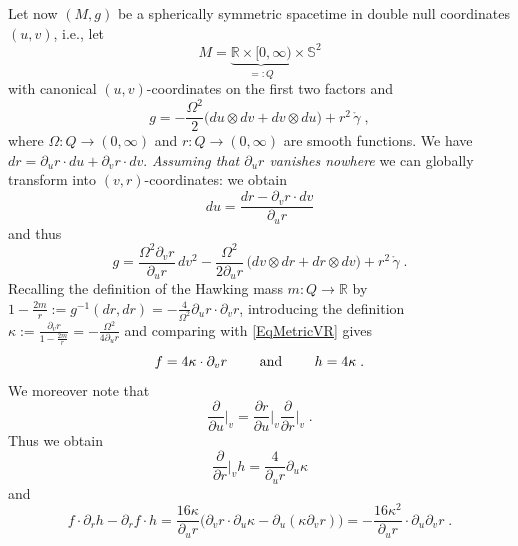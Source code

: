\documentclass[reqno]{article}
\newcommand{\R}{\mathbb{R}}
\newcommand{\rd}{\partial}
\begin{document}
Let now $(M,g)$ be a spherically symmetric spacetime in double null coordinates $(u,v)$, i.e., let $$M = \underbrace{\R \times [0, \infty)}_{=:Q} \times \mathbb{S}^2$$ with canonical $(u,v)$-coordinates on the first two factors and $$g = - \frac{\Omega^2}{2} \big( du \otimes dv + dv \otimes du\big) + r^2 \, \mathring{\gamma} \;,$$ where $\Omega : Q \to (0, \infty)$ and $r : Q \to (0, \infty)$ are smooth functions. We have $dr = \rd_u r \cdot du + \rd_v r \cdot dv$. \emph{Assuming that $\rd_u r $ vanishes nowhere} we can globally transform into $(v,r)$-coordinates: we obtain  $$du = \frac{dr - \rd_v r \cdot dv}{\rd_u r} $$ and thus $$g =  \frac{\Omega^2 \rd_v r}{ \rd_u r} \, dv^2- \frac{\Omega^2}{2 \rd_u r} \, \big( dv \otimes dr + dr \otimes dv\big) + r^2 \, \mathring{\gamma} \;.$$ Recalling the definition of the Hawking mass $m : Q \to \R$ by $1 - \frac{2m}{r} := g^{-1}(dr, dr) = - \frac{4}{\Omega^2} \rd_u r \cdot \rd_v r$, introducing the definition $\kappa := \frac{\rd_v r}{1 - \frac{2m}{r}} = - \frac{\Omega^2}{4 \rd_u r}$ and comparing with \eqref{EqMetricVR} gives
\begin{equation} \label{Eq11}
f = 4 \kappa \cdot \rd_v r \qquad \textnormal{ and } \qquad h = 4 \kappa \;.
\end{equation}
We moreover note that $$\frac{\rd}{\rd u} \Big|_v = \frac{\rd r}{\rd u} \Big|_v  \frac{\rd}{\rd r}\Big|_v \;.$$
Thus we obtain \begin{equation} \label{Eq22}\frac{\rd}{\rd r}\Big|_v h = \frac{4}{\rd_u r} \rd_u \kappa 
\end{equation} and 
\begin{equation} \label{Eq33}
f \cdot \rd_r h - \rd_r f \cdot h = \frac{16 \kappa}{\rd_u r} \big( \rd_v r \cdot \rd_u \kappa - \rd_u ( \kappa \rd_v r)\big) = - \frac{16 \kappa^2}{\rd_u r} \cdot \rd_u \rd_v r \;.\end{equation}
\end{document}
